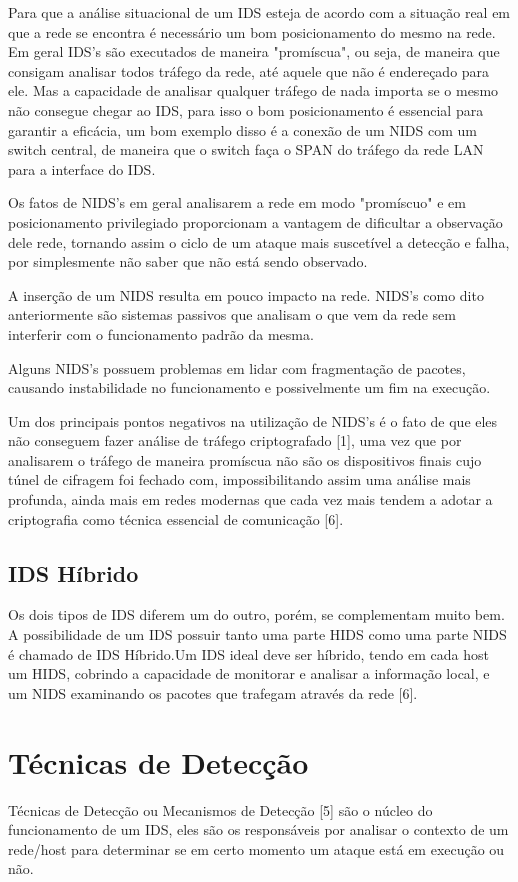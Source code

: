 \documentclass[conference]{IEEEtran}
\begin{document}
Para que a análise situacional de um IDS esteja de acordo com a situação real em que a rede se encontra é necessário um bom posicionamento do mesmo na rede. Em geral IDS's são executados de maneira "promíscua", ou seja, de maneira que consigam analisar todos tráfego da rede, até aquele que não é endereçado para ele. Mas a capacidade de analisar qualquer tráfego de nada importa se o mesmo não consegue chegar ao IDS, para isso o bom posicionamento é essencial para garantir a eficácia, um bom exemplo disso é a conexão de um NIDS com um switch central, de maneira que o switch faça o SPAN do tráfego da rede LAN para a interface do IDS.

Os fatos de NIDS's em geral analisarem a rede em modo "promíscuo" e em posicionamento privilegiado proporcionam a vantagem de dificultar a observação dele rede, tornando assim o ciclo de um ataque mais suscetível a detecção e falha, por simplesmente não saber que não está sendo observado.

A inserção de um NIDS resulta em pouco impacto na rede. NIDS's como dito anteriormente são sistemas passivos que analisam o que vem da rede sem interferir com o funcionamento padrão da mesma.  

Alguns NIDS's possuem problemas em lidar com fragmentação de pacotes, causando instabilidade no funcionamento e possivelmente um fim na execução. 

Um dos principais pontos negativos na utilização de NIDS's é o fato de que eles não conseguem fazer análise de tráfego criptografado [1], uma vez que por analisarem o tráfego de maneira promíscua não são os dispositivos finais cujo túnel de cifragem foi fechado com, impossibilitando assim uma análise mais profunda, ainda mais em redes modernas que cada vez mais tendem a adotar a criptografia como técnica essencial de comunicação [6].

\subsection{IDS Híbrido}
Os dois tipos de IDS diferem um do outro, porém, se complementam muito bem. A possibilidade de um IDS possuir tanto uma parte HIDS como uma parte NIDS é chamado de IDS Híbrido.Um IDS ideal deve ser híbrido, tendo em cada host um HIDS, cobrindo a capacidade de monitorar e analisar a informação local, e um NIDS examinando os pacotes que trafegam através da rede [6].

\section{Técnicas de Detecção}
Técnicas de Detecção ou Mecanismos de Detecção [5] são o núcleo do funcionamento de um IDS, eles são os responsáveis por analisar o contexto de um rede/host para determinar se em certo momento um ataque está em execução ou não.
\end{document}
